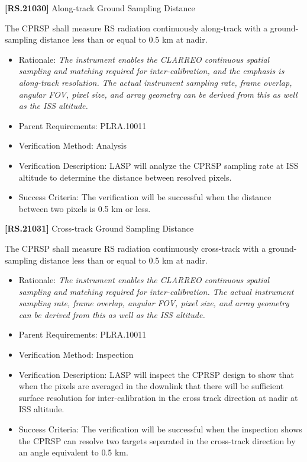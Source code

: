 \documentclass[12pt,oneside,oldfontcommands]{memoir}
\begin{document}
\textbf{[RS.21030]} Along-track Ground Sampling Distance

The \gls{CPRSP} shall \gls{measure} \gls{RS} radiation continuously along-track with a ground-sampling distance less than or equal to 0.5 km at nadir.

\begin{itemize}
\item{} Rationale: \emph{The instrument enables the CLARREO continuous spatial sampling and matching required for inter-calibration, and the emphasis is along-track resolution. The actual instrument sampling rate, frame overlap, angular FOV, pixel size, and array geometry can be derived from this as well as the ISS altitude.}

\item{} Parent Requirements: PLRA.10011

\item{} Verification Method: Analysis

\item{} Verification Description: \gls{LASP} will analyze the \gls{CPRSP} sampling rate at \gls{ISS} altitude to determine the distance between resolved pixels.

\item{} Success Criteria: The verification will be successful when the distance between two pixels is 0.5 km or less.

\end{itemize}

\textbf{[RS.21031]} Cross-track Ground Sampling Distance

The \gls{CPRSP} shall \gls{measure} \gls{RS} radiation continuously cross-track with a ground-sampling distance less than or equal to 0.5 km at nadir.

\begin{itemize}
\item{} Rationale: \emph{The instrument enables the CLARREO continuous spatial sampling and matching required for inter-calibration. The actual instrument sampling rate, frame overlap, angular FOV, pixel size, and array geometry can be derived from this as well as the ISS altitude.}

\item{} Parent Requirements: PLRA.10011

\item{} Verification Method: Inspection

\item{} Verification Description: \gls{LASP} will inspect the \gls{CPRSP} design to show that when the pixels are averaged in the downlink that there will be sufficient surface resolution for inter-calibration in the cross track direction at nadir at \gls{ISS} altitude.

\item{} Success Criteria: The verification will be successful when the \gls{inspection} shows the \gls{CPRSP} can resolve two targets separated in the cross-track direction by an angle equivalent to 0.5 km.

\end{itemize}
\end{document}
